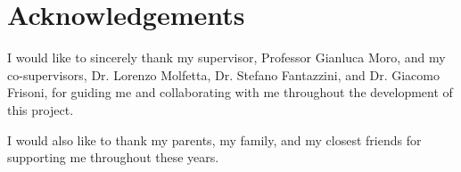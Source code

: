 \documentclass[12pt,a4paper,twoside,openright]{book}
\begin{document}
\backmatter

\chapter*{Acknowledgements}
\label{sec:acknowledgements}

I would like to sincerely thank my supervisor, Professor Gianluca Moro, and my
co-supervisors, Dr. Lorenzo Molfetta, Dr. Stefano Fantazzini, and Dr. Giacomo
Frisoni, for guiding me and collaborating with me throughout the development of
this project.

I would also like to thank my parents, my family, and my closest friends for
supporting me throughout these years.



\end{document}
